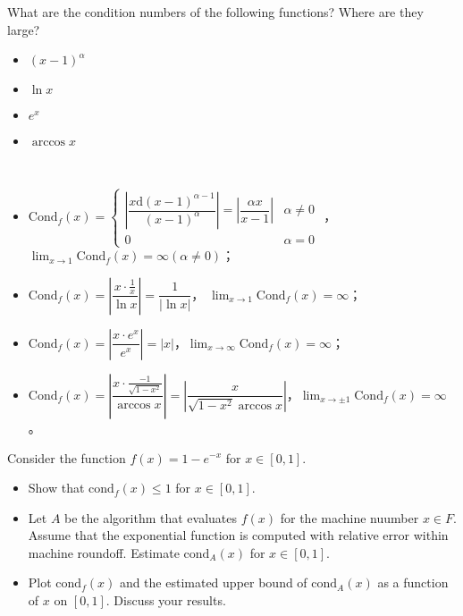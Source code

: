 \documentclass[lang=cn,a4paper,newtx,bibend=bibtex]{elegantpaper}
\begin{document}
\begin{prob}
  What are the condition numbers of the following functions?
  Where are they large?
  \begin{itemize}
    \item $(x-1)^{\alpha}$
    \item $\ln x$
    \item $e^x$
    \item $\arccos x$
  \end{itemize}
\end{prob}

\begin{solution} ~~%

  \begin{itemize}
    \item $\text{Cond}_f (x) = \begin{cases} \left| \dfrac{x \mathrm{d} (x - 1)^{\alpha - 1}}{(x - 1)^{\alpha}} \right| = \left|\dfrac{\alpha x}{x - 1}\right| & \alpha \neq 0 \\ 
            0 & \alpha = 0\end{cases}$
          ，$\lim_{x\to 1}\text{Cond}_f(x) = \infty (\alpha \neq 0)$；
    \item $\text{Cond}_f (x) = \left|\dfrac{x \cdot \frac1x}{\ln x}\right| = \dfrac{1}{|\ln x|}$， $\lim_{x\to 1} \text{Cond}_f(x) = \infty$；
    \item $\text{Cond}_f (x) = \left|\dfrac{x\cdot e^x}{e^x}\right| = |x|$，$\lim_{x \to \infty} \text{Cond}_f(x) = \infty$；
    \item $\text{Cond}_f (x) = \left|\dfrac{x\cdot \frac{-1}{\sqrt{1-x^2}}}{\arccos x}\right| = \left|\dfrac{x}{\sqrt{1-x^2}\arccos x}\right|$，$\lim_{x\to \pm 1}\text{Cond}_f(x) = \infty$。
  \end{itemize}
\end{solution}

\begin{prob}[4.4.1-\textrm{IX}.]
  Consider the function $f(x) = 1 - e^{-x}$ for $x \in [0, 1]$.
  \begin{itemize}
    \item Show that $\text{cond}_f(x) \le 1$ for $x \in [0, 1]$.
    \item Let $A$ be the algorithm that evaluates $f(x)$ for
    the machine nuumber $x \in F$. Assume that the exponential 
    function is computed with relative error
    within machine roundoff. Estimate $\text{cond}_A(x)$ for
    $x \in [0, 1]$.
    \item Plot $\text{cond}_f(x)$ and the estimated upper bound of
    $\text{cond}_A(x)$ as a function of $x$ on $[0, 1]$. Discuss your 
    results.
  \end{itemize}
\end{prob}
\end{document}
